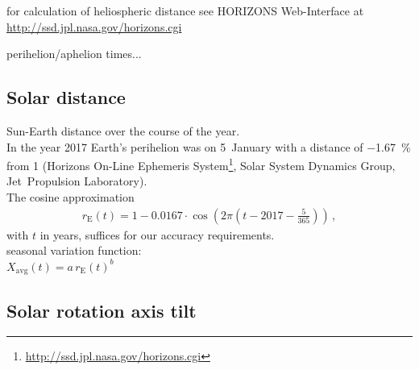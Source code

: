 for calculation of heliospheric distance see HORIZONS Web-Interface at \url{http://ssd.jpl.nasa.gov/horizons.cgi}

perihelion/aphelion times...

\subsection{Solar distance}

Sun-Earth distance over the course of the year.\\
In the year 2017 Earth's perihelion was on 5~January with a distance of \SI{-1.67}{\percent} from \SI{1}{\au} (Horizons On-Line Ephemeris System\footnote{\url{http://ssd.jpl.nasa.gov/horizons.cgi}}, Solar System Dynamics Group, Jet~Propulsion Laboratory).\\
The cosine approximation
\begin{align}
	r_\text{E}(t) = 1 - 0.0167 \cdot \cos\left(2 \pi \left(t - 2017 - \frac{5}{365}\right)\right)\,,
\end{align}
with $t$ in years, suffices for our accuracy requirements.\\

seasonal variation function:\\
$X_\text{avg}(t) = a\,r_\text{E}(t)^b$\\

\subsection{Solar rotation axis tilt}

